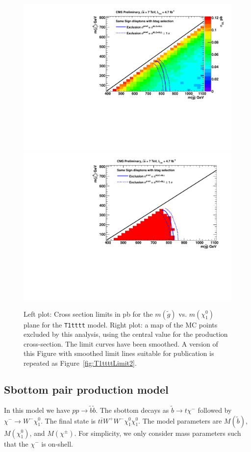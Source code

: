 \begin{figure}[htb]
\begin{center}
\includegraphics[width=0.48\linewidth]{figs/T1tttt_LimitsOnCarpet.pdf}
\includegraphics[width=0.48\linewidth]{figs/T1tttt_ExcludedRegionMap.pdf}
\caption{
Left plot: Cross section limits in pb for the $m(\widetilde{g})$ vs. 
$m(\chi_1^0)$ plane for the
{\tt T1tttt} model.  Right plot: a map of the MC points excluded by this
analysis, using the central value for the production cross-section.
The limit curves have been smoothed.
A version of this Figure with smoothed limit lines suitable for 
publication is repeated as Figure~\ref{fig:T1ttttLimit2}.\label{fig:T1ttttLimit}}
\end{center}
\end{figure}



\clearpage

\subsection{Sbottom pair production model}
\label{sec:sbottompair}
In this model we have $pp \to \tilde{b}\tilde{b}$.  The sbottom decays 
as $\tilde{b} \to t\chi^{-}$ followed by $\chi^{-} \to W^- \chi_1^0$. 
The final state is $t\bar{t}W^+W^- \chi_1^0 \chi_1^0$. 
The model parameters are $M(\widetilde{b})$, $M(\chi_1^0)$, and $M(\chi^{\pm})$.
For simplicity, we only consider mass parameters such that the $\chi^{-}$ is on-shell.

